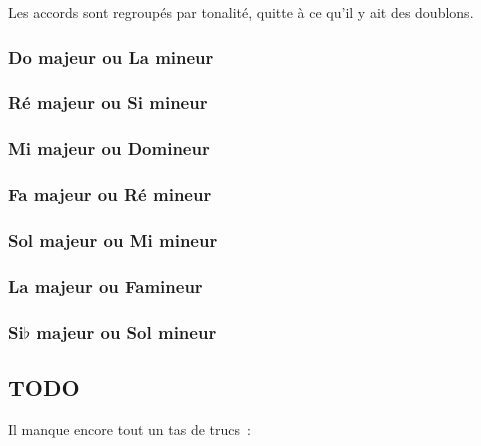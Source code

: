 \documentclass[11pt]{article}
\begin{document}
Les accords sont regroupés par tonalité, quitte à ce qu’il y ait des doublons.

\subsubsection{Do majeur ou La mineur}


\subsubsection{Ré majeur ou Si mineur}


\subsubsection{Mi majeur ou Do\shrp mineur}


\subsubsection{Fa majeur ou Ré mineur}


\subsubsection{Sol majeur ou Mi mineur}


\subsubsection{La majeur ou Fa\shrp mineur}


\subsubsection{Si$\flat$ majeur ou Sol mineur}


\subsection{TODO}



Il manque encore tout un tas de trucs~:
\end{document}

